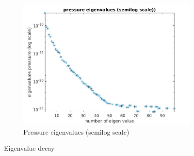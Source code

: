 \documentclass[graybox]{svmult}
\begin{document}
\begin{figure}[H]
\begin{subfigure}{0.31\textwidth}
\includegraphics[width=\linewidth]{pressure_eigen_value_semilog.jpg}
\caption{Pressure eigenvalues (semilog scale)} \label{pressure_ev}
\end{subfigure}
\caption{Eigenvalue decay}\label{ev_decay}
\end{figure}

%



%
\end{document}
